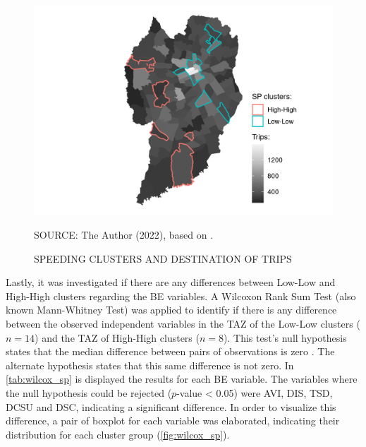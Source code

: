 \begin{figure}[!htbp]
    \footnotesize
    \captionsetup{font=footnotesize}
    \caption{SPEEDING CLUSTERS AND DESTINATION OF TRIPS}
    \centering
    \includegraphics{fig/od_plot.png}
    \label{fig:sp_od}
    \par SOURCE: The Author (2022), based on \textcite{IPPUC2018b}.
\end{figure}

Lastly, it was investigated if there are any differences between Low-Low and High-High clusters regarding the BE variables. A Wilcoxon Rank Sum Test (also known Mann-Whitney Test) was applied to identify if there is any difference between the observed independent variables in the TAZ of the Low-Low clusters ($n = 14$) and the TAZ of High-High clusters ($n = 8$). This test's null hypothesis states that the median difference between pairs of observations is zero \cite{hollanderNonparametricStatisticalMethods2015}. The alternate hypothesis states that this same difference is not zero. In \autoref{tab:wilcox_sp} is displayed the results for each BE variable. The variables where the null hypothesis could be rejected ($p$-value < 0.05) were AVI, DIS, TSD, DCSU and DSC, indicating a significant difference. In order to visualize this difference, a pair of boxplot for each variable was elaborated, indicating their distribution for each cluster group (\autoref{fig:wilcox_sp}).

